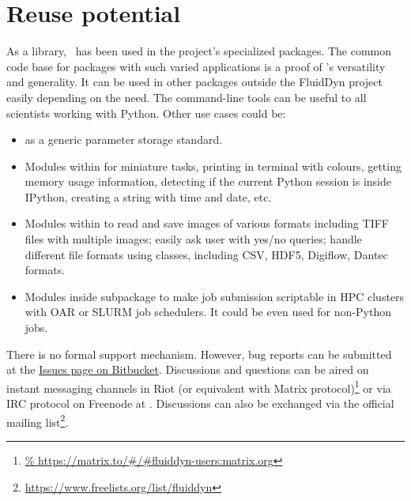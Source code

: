 \section{Reuse potential}
%
%

As a library, \fluiddyn\ has been used in the project's specialized packages.
The common code base for packages with such varied applications is a proof of
\fluiddyn's versatility and generality. It can be used in other packages outside
the FluidDyn project easily depending on the need. The command-line tools can
be useful to all scientists working with Python. Other use cases could be:
\begin{itemize}
	\item {} as a generic parameter storage
		standard.
	\item Modules within  for miniature tasks,
		printing in terminal with colours, getting memory usage
		information, detecting if the current Python session is inside
		IPython, creating a string with time and date, etc.
	\item Modules within  to read
		and save images of various formats including TIFF files with
		multiple images; easily ask user with yes/no queries; handle
		different file formats using classes, including CSV, HDF5,
		Digiflow, Dantec formats.
	\item Modules inside  subpackage to
		make job submission scriptable in HPC clusters with OAR or
		SLURM job schedulers. It could be even used for non-Python
		jobs.
\end{itemize}


There is no formal support mechanism. However, bug reports can be submitted at the
\href{https://bitbucket.org/fluiddyn/fluiddyn/issues}{Issues page on Bitbucket}.
Discussions and questions can be aired on instant messaging channels in Riot (or
equivalent with Matrix protocol)\footnote{
\url{%
  https://matrix.to/\#/\#fluiddyn-users:matrix.org}}
or via IRC protocol on Freenode at . Discussions
can also be exchanged via the official mailing list\footnote{
\url{https://www.freelists.org/list/fluiddyn}}.

